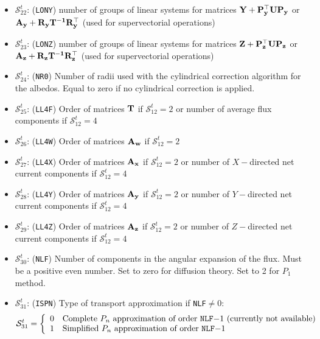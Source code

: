 \begin{itemize}
\item $\mathcal{S}^{t}_{22}$: ({\tt LONY})  number of groups of linear systems for matrices
$\bf{Y}+\bf{P}_y^\top \bf{U}\bf{P}_y$ or $\bf{A}_y+\bf{R}_y\bf{T}^{-1}\bf{R}_y^\top$ (used
for supervectorial operations)

\item $\mathcal{S}^{t}_{23}$: ({\tt LONZ})  number of groups of linear systems for matrices
$\bf{Z}+\bf{P}_z^\top \bf{U}\bf{P}_z$ or $\bf{A}_z+\bf{R}_z\bf{T}^{-1}\bf{R}_z^\top$ (used
for supervectorial operations)

\item $\mathcal{S}^{t}_{24}$: ({\tt NR0}) Number of radii used with the cylindrical correction
algorithm for the albedos. Equal to zero if no cylindrical correction is applied.

\item $\mathcal{S}^{t}_{25}$: ({\tt LL4F}) Order of matrices $\bf{T}$ if $\mathcal{S}^{t}_{12}=2$ or number of average flux components if $\mathcal{S}^{t}_{12}=4$

\item $\mathcal{S}^{t}_{26}$: ({\tt LL4W}) Order of matrices $\bf{A_w}$ if $\mathcal{S}^{t}_{12}=2$

\item $\mathcal{S}^{t}_{27}$: ({\tt LL4X}) Order of matrices $\bf{A_x}$ if $\mathcal{S}^{t}_{12}=2$ or number of $X-$directed net current components if $\mathcal{S}^{t}_{12}=4$

\item $\mathcal{S}^{t}_{28}$: ({\tt LL4Y}) Order of matrices $\bf{A_y}$ if $\mathcal{S}^{t}_{12}=2$ or number of $Y-$directed net current components if $\mathcal{S}^{t}_{12}=4$

\item $\mathcal{S}^{t}_{29}$: ({\tt LL4Z}) Order of matrices $\bf{A_z}$ if $\mathcal{S}^{t}_{12}=2$ or number of $Z-$directed net current components if $\mathcal{S}^{t}_{12}=4$

\item $\mathcal{S}^{t}_{30}$: ({\tt NLF}) Number of components in the angular expansion of the flux. Must be a positive
even number. Set to zero for diffusion theory. Set to 2 for $P_1$ method.

\item $\mathcal{S}^{t}_{31}$: ({\tt ISPN}) Type of transport approximation if {\tt NLF}$\ne 0$:
\begin{displaymath}
\mathcal{S}^{t}_{31} = \left\{
\begin{array}{rl}
 0 & \textrm{Complete $P_n$ approximation of order {\tt NLF}$-1$ (currently not available)}\\
 1 & \textrm{Simplified $P_n$ approximation of order {\tt NLF}$-1$}
\end{array} \right.
\end{displaymath}


\end{itemize}
